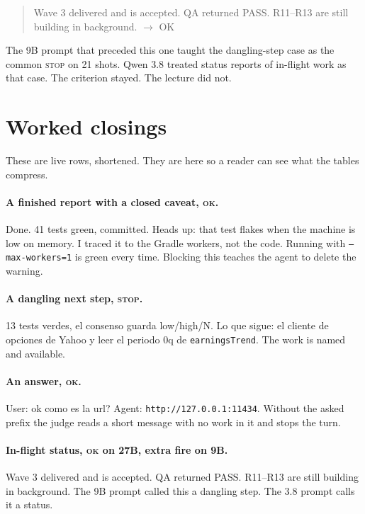 \begin{quote}
\ttfamily\footnotesize
Wave 3 delivered and is accepted. QA returned PASS. R11--R13 are
still building in background. $\rightarrow$ OK
\end{quote}

The 9B prompt that preceded this one taught the dangling-step case as
the common \textsc{stop} on 21 shots. Qwen 3.8 treated status reports
of in-flight work as that case. The criterion stayed. The lecture
did not.

\section{Worked closings}
\label{app:cases}

These are live rows, shortened. They are here so a reader can see
what the tables compress.

\paragraph{A finished report with a closed caveat, \textsc{ok}.}
Done. 41 tests green, committed. Heads up: that test flakes when the
machine is low on memory. I traced it to the Gradle workers, not the
code. Running with \texttt{--max-workers=1} is green every time.
Blocking this teaches the agent to delete the warning.

\paragraph{A dangling next step, \textsc{stop}.}
13 tests verdes, el consenso guarda low/high/N. Lo que sigue: el
cliente de opciones de Yahoo y leer el periodo 0q de
\texttt{earningsTrend}. The work is named and available.

\paragraph{An answer, \textsc{ok}.}
User: ok como es la url? Agent: \texttt{http://127.0.0.1:11434}.
Without the asked prefix the judge reads a short message with no
work in it and stops the turn.

\paragraph{In-flight status, \textsc{ok} on 27B, extra fire on 9B.}
Wave 3 delivered and is accepted. QA returned PASS. R11--R13 are
still building in background. The 9B prompt called this a dangling
step. The 3.8 prompt calls it a status.

